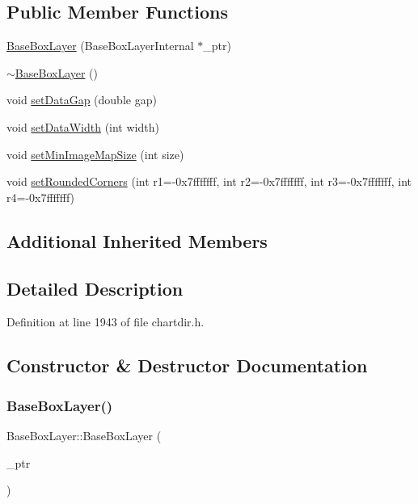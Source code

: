 \subsection*{Public Member Functions}
\begin{DoxyCompactItemize}
\item 
\hyperlink{class_base_box_layer_ae717a5598ef3e7925c4b69d7a5d17ba3}{Base\+Box\+Layer} (Base\+Box\+Layer\+Internal $\ast$\+\_\+ptr)
\item 
\hyperlink{class_base_box_layer_aef86dbd6f32fdda32786c0cbdc64101e}{$\sim$\+Base\+Box\+Layer} ()
\item 
void \hyperlink{class_base_box_layer_a1d7193833d5c13dda5fa30ca431c72f5}{set\+Data\+Gap} (double gap)
\item 
void \hyperlink{class_base_box_layer_a49c2e59633573b52f02e399bec37b46e}{set\+Data\+Width} (int width)
\item 
void \hyperlink{class_base_box_layer_af812d2d5a07c3e21c928aca3245b2ad9}{set\+Min\+Image\+Map\+Size} (int size)
\item 
void \hyperlink{class_base_box_layer_a5ae92b6660c23c10cbaaaeb2c1129db9}{set\+Rounded\+Corners} (int r1=-\/0x7fffffff, int r2=-\/0x7fffffff, int r3=-\/0x7fffffff, int r4=-\/0x7fffffff)
\end{DoxyCompactItemize}
\subsection*{Additional Inherited Members}


\subsection{Detailed Description}


Definition at line 1943 of file chartdir.\+h.



\subsection{Constructor \& Destructor Documentation}
\mbox{\label{class_base_box_layer_ae717a5598ef3e7925c4b69d7a5d17ba3}} 
\subsubsection{\texorpdfstring{Base\+Box\+Layer()}{BaseBoxLayer()}}
{\footnotesize\ttfamily Base\+Box\+Layer\+::\+Base\+Box\+Layer (\begin{DoxyParamCaption}\item[{Base\+Box\+Layer\+Internal $\ast$}]{\+\_\+ptr }\end{DoxyParamCaption})\hspace{0.3cm}{\ttfamily [inline]}}



